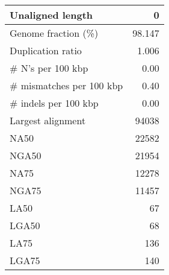 \documentclass[12pt,a4paper]{article}
\begin{document}
\begin{table}[ht]
\begin{center}
\begin{tabular}{|l*{1}{|r}|}
Unaligned length & 0 \\ \hline
Genome fraction (\%) & 98.147 \\ \hline
Duplication ratio & 1.006 \\ \hline
\# N's per 100 kbp & 0.00 \\ \hline
\# mismatches per 100 kbp & 0.40 \\ \hline
\# indels per 100 kbp & 0.00 \\ \hline
Largest alignment & 94038 \\ \hline
NA50 & 22582 \\ \hline
NGA50 & 21954 \\ \hline
NA75 & 12278 \\ \hline
NGA75 & 11457 \\ \hline
LA50 & 67 \\ \hline
LGA50 & 68 \\ \hline
LA75 & 136 \\ \hline
LGA75 & 140 \\ \hline
\end{tabular}
\end{center}
\end{table}
\end{document}
